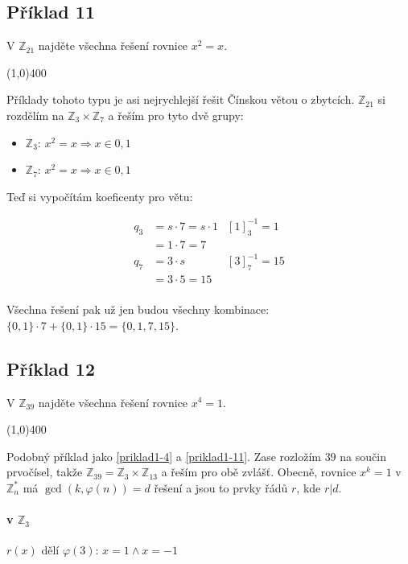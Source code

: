 \documentclass{article}
\begin{document}
\subsection{\label{priklad1-11}Příklad 11}
V $\mathbb{Z}_{21}$ najděte všechna řešení rovnice $x^2 = x$.

\line(1,0){400}

Příklady tohoto typu je asi nejrychlejší řešit Čínskou větou o zbytcích. $\mathbb{Z}_{21}$ si rozdělím na $\mathbb{Z}_{3} \times \mathbb{Z}_{7}$ a řeším pro tyto dvě grupy:

\begin{itemize}
	\item $\mathbb{Z}_{3}$: $x^2 = x \Rightarrow x \in {0,1}$
	\item $\mathbb{Z}_{7}$: $x^2 = x \Rightarrow x \in {0,1}$ 
\end{itemize}

Teď si vypočítám koeficenty pro větu:

\begin{align*}
q_3 & = s\cdot 7 = s\cdot 1 & \left[ 1\right]^{-1}_3 = 1\\
		& = 1 \cdot 7 = 7 \\
q_7 & = 3 \cdot s & \left[ 3\right]^{-1}_{7} = 15\\
		& = 3 \cdot 5 = 15 \\
\end{align*}

Všechna řešení pak už jen budou všechny kombinace: $\{0,1\}\cdot 7 + \{0,1\}\cdot 15 = \{0,1,7,15\}$.

\subsection{\label{priklad1-12}Příklad 12}
V $\mathbb{Z}_{39}$ najděte všechna řešení rovnice $x^4 = 1$.

\line(1,0){400}

Podobný příklad jako \ref{priklad1-4} a \ref{priklad1-11}. Zase rozložím $39$ na součin prvočísel, takže $\mathbb{Z}_{39} = \mathbb{Z}_{3} \times \mathbb{Z}_{13}$ a řeším pro obě zvlášť. Obecně, rovnice $x^k = 1$ v $\mathbb{Z}_n^*$ má $\gcd(k, \varphi(n)) = d$ řešení a jsou to prvky řádů $r$, kde $r|d$.

\paragraph{v $\mathbb{Z}_3$}
$r(x)$ dělí $\varphi(3)$: $x = 1 \wedge x = -1$ 
\end{document}
